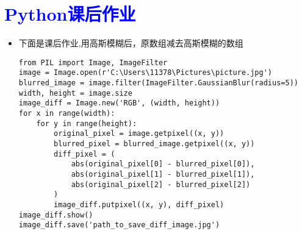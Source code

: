 \documentclass{article}
\begin{document}
\section{\textcolor{blue}{Python课后作业}} 
\begin{itemize}
\item 下面是课后作业,用高斯模糊后，原数组减去高斯模糊的数组
\begin{lstlisting}  
from PIL import Image, ImageFilter  
image = Image.open(r'C:\Users\11378\Pictures\picture.jpg')  
blurred_image = image.filter(ImageFilter.GaussianBlur(radius=5))  
width, height = image.size  
image_diff = Image.new('RGB', (width, height))  
for x in range(width):  
    for y in range(height):  
        original_pixel = image.getpixel((x, y))  
        blurred_pixel = blurred_image.getpixel((x, y))  
        diff_pixel = (  
            abs(original_pixel[0] - blurred_pixel[0]),  
            abs(original_pixel[1] - blurred_pixel[1]),  
            abs(original_pixel[2] - blurred_pixel[2])  
        )  
        image_diff.putpixel((x, y), diff_pixel)  
image_diff.show()  
image_diff.save('path_to_save_diff_image.jpg')
\end{lstlisting}   
\end{itemize}
\end{document}
